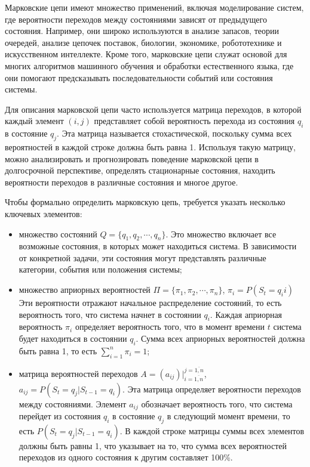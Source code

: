 Марковские цепи имеют множество применений, включая моделирование систем, где вероятности переходов между состояниями зависят от предыдущего состояния. Например, они широко используются в анализе запасов, теории очередей, анализе цепочек поставок, биологии, экономике, робототехнике и искусственном интеллекте. Кроме того, марковские цепи служат основой для многих алгоритмов машинного обучения и обработки естественного языка, где они помогают предсказывать последовательности событий или состояния системы.

Для описания марковской цепи часто используется матрица переходов, в которой каждый элемент $(i, j)$ представляет собой вероятность перехода из состояния $q_i$ в состояние $q_j$. Эта матрица называется стохастической, поскольку сумма всех вероятностей в каждой строке должна быть равна 1. Используя такую матрицу, можно анализировать и прогнозировать поведение марковской цепи в долгосрочной перспективе, определять стационарные состояния, находить вероятности переходов в различные состояния и многое другое.

Чтобы формально определить марковскую цепь, требуется указать несколько ключевых элементов:

\begin{itemize}
	\item множество состояний $Q = \{q_1, q_2, \cdots, q_n\}$. Это множество включает все возможные состояния, в которых может находиться система. В зависимости от конкретной задачи, эти состояния могут представлять различные категории, события или положения системы;
	\item множество априорных вероятностей $\Pi = \{ \pi_1, \pi_2, \cdots, \pi_n \}$, $\pi_i = P(S_t = q_ii)$ Эти вероятности отражают начальное распределение состояний, то есть вероятность того, что система начнет в состоянии $q_i$. Каждая априорная вероятность $\pi_i$ определяет вероятность того, что в момент времени $t$ система будет находиться в состоянии $q_i$. Сумма всех априорных вероятностей должна быть равна 1, то есть $\sum_{i=1}^{n} \pi_i = 1$;
	\item матрица вероятностей переходов $A = \left(a_{ij}\right)|_{i=\overline{1,n}}^{j=\overline{1,n}}$, $a_{ij} = P(S_t = q_j | S_{t-1} = q_i)$. Эта матрица определяет вероятности переходов между состояниями. Элемент $a_{ij}$ обозначает вероятность того, что система перейдет из состояния $q_i$ в состояние $q_j$ в следующий момент времени, то есть $P(S_t = q_j | S_{t-1} = q_i)$. В каждой строке матрицы суммы всех элементов должны быть равны 1, что указывает на то, что сумма всех вероятностей переходов из одного состояния к другим составляет 100\%.
\end{itemize}

